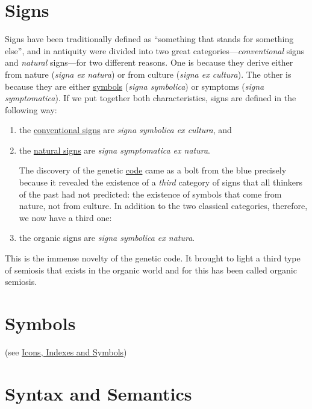 \documentclass[12pt]{article}
\begin{document}
\section{Signs}
Signs have been traditionally defined as ``something that stands for something else'', and in antiquity were divided into two great categories---\textit{conventional} signs and \textit{natural} signs---for two different reasons. One is because they derive either from nature (\textit{signa ex natura}) or from culture (\textit{signa ex cultura}). The other is because they are either \hyperlink{icons_indexes_and_symbols}{symbols} (\textit{signa symbolica}) or symptoms (\textit{signa symptomatica}). If we put together both characteristics, signs are defined in the following way: 
\begin{enumerate}
\item the \hyperlink{conventional_signs}{conventional signs} are \textit{signa symbolica ex cultura}, and
\item the \hyperlink{natural_signs}{natural signs} are \textit{signa symptomatica ex natura}.

The discovery of the genetic \hyperlink{code}{code} came as a bolt from the blue precisely because it revealed the existence of a \textit{third} category of signs that all thinkers of the past had not predicted: the existence of symbols that come from nature, not from culture. In addition to the two classical categories, therefore, we now have a third one:

\item the organic signs are \textit{signa symbolica ex natura}.
\end{enumerate}
This is the immense novelty of the genetic code. It brought to light a third type of semiosis that exists in the organic world and for this has been called organic semiosis.
 

\hypertarget{symbols}{}
\section{Symbols} (see \hyperlink{icons_indexes_and_symbols}{Icons, Indexes and Symbols})

\hypertarget{syntax_and_semantics}{}
\section{Syntax and Semantics}
\end{document}
